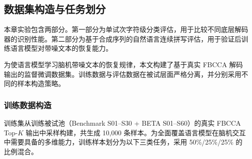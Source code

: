 \begin{table}[htbp]
\label{ta:chap2_params}
\renewcommand{\arraystretch}{1.8}
\centering
{}
\end{table}



\subsection{数据集构造与任务划分}
\label{subsec:chap2_sample_construction}

本章实验包含两部分。第一部分为单试次字符级分类评估，用于比较不同底层解码器的识别性能。第二部分为基于合成序列的自然语言连续拼写评估，用于验证后训练语言模型对带噪文本的恢复能力。

为使语言模型学习脑机带噪文本的恢复规律，本文构建了基于真实 FBCCA 解码输出的监督微调数据集。训练数据与评估数据在被试层面严格分离，并分别采用不同的样本构造策略。

\subsubsection{训练数据构造}

训练集从训练被试池（Benchmark S01--S30 + BETA S01--S60）的真实 FBCCA Top-$K$ 输出中采样构建，共生成 10,000 条样本。为全面覆盖语言模型在脑机交互中需要具备的多维能力，训练样本划分为以下三类任务，采用 50\%/25\%/25\% 的比例混合。

